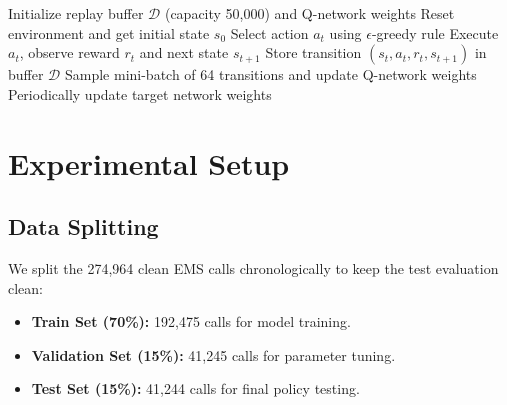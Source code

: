 \documentclass[11pt,a4paper]{article}
\begin{document}
\begin{algorithm}[H]
\caption{DQN Policy Training Loop}
\label{alg:dqn_train}
\begin{algorithmic}[1]
\State Initialize replay buffer $\mathcal{D}$ (capacity 50,000) and Q-network weights
    \State Reset environment and get initial state $s_0$
        \State Select action $a_t$ using $\epsilon$-greedy rule
        \State Execute $a_t$, observe reward $r_t$ and next state $s_{t+1}$
        \State Store transition $(s_t, a_t, r_t, s_{t+1})$ in buffer $\mathcal{D}$
            \State Sample mini-batch of 64 transitions and update Q-network weights
        \EndIf
        \State Periodically update target network weights
    \EndFor
\EndFor
\end{algorithmic}
\end{algorithm}

\section{Experimental Setup}
\label{sec:experiments}

\subsection{Data Splitting}
We split the 274,964 clean EMS calls chronologically to keep the test evaluation clean:
\begin{itemize}[leftmargin=*]
    \item \textbf{Train Set (70\%):} 192,475 calls for model training.
    \item \textbf{Validation Set (15\%):} 41,245 calls for parameter tuning.
    \item \textbf{Test Set (15\%):} 41,244 calls for final policy testing.
\end{itemize}
\end{document}
